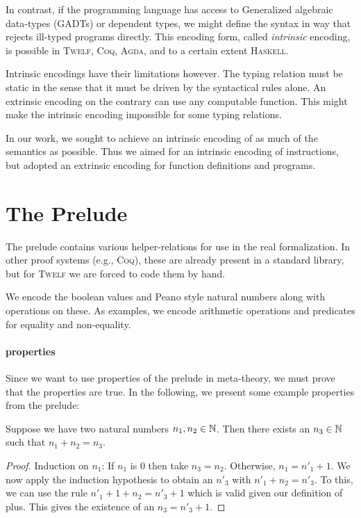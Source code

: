 \documentclass[a4paper, oneside, 10pt, final]{memoir}
\newcommand{\twelf}{\textsc{Twelf}}
\newcommand{\coq}{\textsc{Coq}}
\newcommand{\agda}{\textsc{Agda}}
\newcommand{\haskell}{\textsc{Haskell}}
\begin{document}
In contrast, if the programming language has access to Generalized
algebraic data-types (GADTs) or dependent types, we might define the
syntax in way that rejects ill-typed programs directly. This encoding
form, called \emph{intrinsic} encoding, is possible in \twelf{},
\coq{}, \agda{}, and to a certain extent \haskell{}.

Intrinsic encodings have their limitations however. The typing
relation must be static in the sense that it must be driven by the
syntactical rules alone. An extrinsic encoding on the contrary can use
any computable function. This might make the
intrinsic encoding impossible for some typing relations.

In our work, we sought to achieve an intrinsic encoding of as much of
the semantics as possible. Thus we aimed for an intrinsic encoding of
instructions, but adopted an extrinsic encoding for function
definitions and programs.

\section{The Prelude}

The prelude contains various helper-relations for use in the real
formalization. In other proof systems (e.g., \coq{}\cite{team:coq*1}),
these are already present in a standard library, but for \twelf{} we
are forced to code them by hand.

We encode the boolean values and Peano style natural numbers along with
operations on these. As examples, we encode arithmetic operations and
predicates for equality and non-equality.

\paragraph{properties}

Since we want to use properties of the prelude in meta-theory, we must
prove that the properties are true. In the following, we present some
example properties from the prelude:
\begin{lem}
  Suppose we have two natural numbers $n_1, n_2 \in \mathbb{N}$. Then there
  exists an $n_3 \in \mathbb{N}$ such that $n_1 + n_2 = n_3$.
\end{lem}
\begin{proof}
  Induction on $n_1$: If $n_1$ is $0$ then take $n_3 =
  n_2$. Otherwise, $n_1 = n'_1 + 1$. We now apply the induction
  hypothesis to obtain an $n'_3$ with $n'_1 + n_2 = n'_3$. To this, we
  can use the rule $n'_1 + 1 + n_2 = n'_3 + 1$ which is valid given
  our definition of plus. This gives the existence of an $n_3 = n'_3 +
  1$.
\end{proof}
\end{document}

